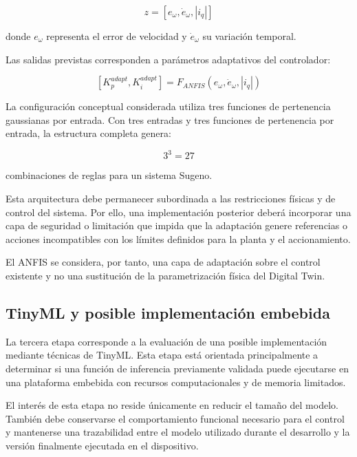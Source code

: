 \begin{equation}
z=
\left[
e_{\omega},
\dot e_{\omega},
|i_q|
\right]
\end{equation}

donde $e_{\omega}$ representa el error de velocidad y $\dot e_{\omega}$ su variación temporal.

Las salidas previstas corresponden a parámetros adaptativos del controlador:

\begin{equation}
\left[
K_p^{adapt},
K_i^{adapt}
\right]
=
F_{ANFIS}
\left(
e_{\omega},
\dot e_{\omega},
|i_q|
\right)
\end{equation}

La configuración conceptual considerada utiliza tres funciones de pertenencia gaussianas por entrada. Con tres entradas y tres funciones de pertenencia por entrada, la estructura completa genera:

\begin{equation}
3^3=27
\end{equation}

combinaciones de reglas para un sistema Sugeno.

Esta arquitectura debe permanecer subordinada a las restricciones físicas y de control del sistema. Por ello, una implementación posterior deberá incorporar una capa de seguridad o limitación que impida que la adaptación genere referencias o acciones incompatibles con los límites definidos para la planta y el accionamiento.

El ANFIS se considera, por tanto, una capa de adaptación sobre el control existente y no una sustitución de la parametrización física del Digital Twin.

\subsection{TinyML y posible implementación embebida}

La tercera etapa corresponde a la evaluación de una posible implementación mediante técnicas de TinyML. Esta etapa está orientada principalmente a determinar si una función de inferencia previamente validada puede ejecutarse en una plataforma embebida con recursos computacionales y de memoria limitados.

El interés de esta etapa no reside únicamente en reducir el tamaño del modelo. También debe conservarse el comportamiento funcional necesario para el control y mantenerse una trazabilidad entre el modelo utilizado durante el desarrollo y la versión finalmente ejecutada en el dispositivo.

